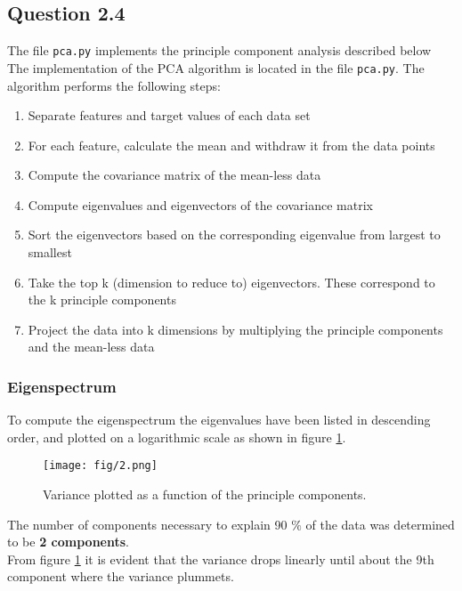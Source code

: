 \documentclass{article}
\begin{document}
\subsection{Question 2.4}
The file \texttt{pca.py} implements the principle component analysis described below \\
The implementation of the PCA algorithm is located in the file \texttt{pca.py}. The algorithm performs the following steps:
\begin{enumerate}
\item{Separate features and target values of each data set}
\item{For each feature, calculate the mean and withdraw it from the data points}
\item{Compute the covariance matrix of the mean-less data}
\item{Compute eigenvalues and eigenvectors of the covariance matrix}
\item{Sort the eigenvectors based on the corresponding eigenvalue from largest to smallest}
\item{Take the top k (dimension to reduce to) eigenvectors. These correspond to the k principle components}
\item{Project the data into k dimensions by multiplying the principle components and the mean-less data}
\end{enumerate}
\subsubsection{Eigenspectrum}
To compute the eigenspectrum the eigenvalues have been listed in descending order, and plotted on a logarithmic scale as shown in figure \ref{fig:eig}.
\begin{figure}[H]
  \centering
  \texttt{[image: fig/2.png]}
  \caption{Variance plotted as a function of the principle components.}
  \label{fig:eig}
\end{figure}
The number of components necessary to explain 90 $\%$ of the data was determined to be \textbf{2 components}. \\
From figure \ref{fig:eig} it is evident that the variance drops linearly until about the 9th component where the variance plummets.
\end{document}
